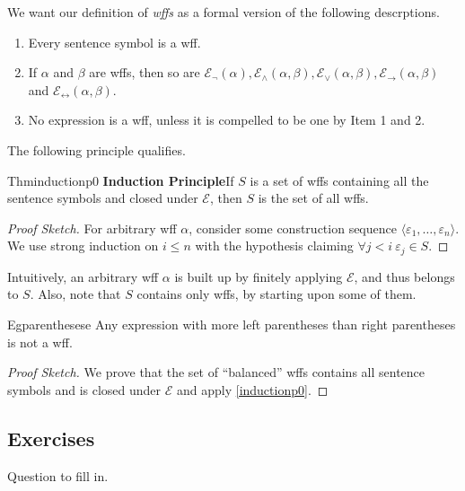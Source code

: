 We want our definition of \textit{wffs} as a formal version of the following descrptions.

\begin{enumerate}
  \item Every sentence symbol is a wff.
  \item If $\alpha$ and $\beta$ are wffs, then so are $\mathcal{E}_{\neg}(\alpha), \mathcal{E}_{\wedge}(\alpha,\beta), \mathcal{E}_{\vee}(\alpha,\beta), \mathcal{E}_{\rightarrow}(\alpha,\beta)$ and $\mathcal{E}_{\leftrightarrow}(\alpha,\beta)$.
  \item No expression is a wff, unless it is compelled to be one by Item 1 and 2.
\end{enumerate}

The following principle qualifies.

\begin{reference}{Thm}{inductionp0}
  \textbf{Induction Principle}\quad If $S$ is a set of wffs containing all the sentence symbols and closed under $\mathcal{E}$, then $S$ is the set of all wffs.
\end{reference}

\begin{proof}[Proof Sketch]
  For arbitrary wff $\alpha$, consider some construction sequence $\langle \varepsilon_1,\dots,\varepsilon_n\rangle$. We use strong induction on $i\leq n$ with the hypothesis claiming $\forall j<i\ \varepsilon_j\in S$.
\end{proof}

Intuitively, an arbitrary wff $\alpha$ is built up by finitely applying $\mathcal{E}$, and thus belongs to $S$. Also, note that $S$ contains only wffs, by starting upon some of them.

\begin{reference}{Eg}{parenthesese}
  Any expression with more left parentheses than right parentheses is not a wff.
\end{reference}

\begin{proof}[Proof Sketch]
  We prove that the set of ``balanced'' wffs contains all sentence symbols and is closed under $\mathcal{E}$ and apply \ref{inductionp0}.
\end{proof}

\subsection*{Exercises}

\begin{exercise}
  Question to fill in.
\end{exercise}

